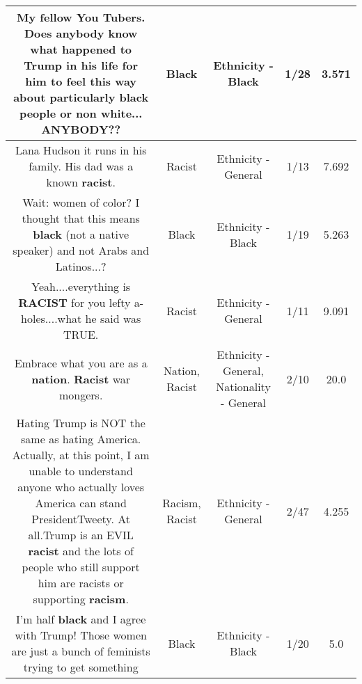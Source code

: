 \documentclass[11pt]{article}
\newlength\mylength
\begin{document}
\begin{center}
\begin{longtable}{|C{.65\mylength}|C{.30\mylength}|C{.12\mylength}|C{.12\mylength}|C{.12\mylength}|}
  \small My fellow You Tubers. Does anybody know what happened to Trump in his life for him to feel this way about particularly \textbf{black} people or non white... ANYBODY??\normalsize   & Black & Ethnicity - Black & 1/28 & 3.571 \\  \hline
  \small Lana Hudson  it runs in his family. His dad was a known \textbf{racist}.\normalsize   & Racist & Ethnicity - General & 1/13 & 7.692 \\  \hline
  \small Wait: women of color? I thought that this means \textbf{black} (not a native speaker) and not Arabs and Latinos...?\normalsize   & Black & Ethnicity - Black & 1/19 & 5.263 \\  \hline
  \small Yeah....everything is \textbf{RACIST} for you lefty a-holes....what he said was TRUE.\normalsize   & Racist & Ethnicity - General & 1/11 & 9.091 \\  \hline
  \small Embrace what you are as a \textbf{nation}. \textbf{Racist} war mongers.\normalsize   & Nation, Racist & Ethnicity - General, Nationality - General & 2/10 & 20.0 \\  \hline
  \small Hating Trump is NOT the same as hating America. Actually, at this point, I am unable to understand anyone who actually loves America can stand PresidentTweety. At all.Trump is an EVIL \textbf{racist} and the lots of people who still support him are racists or supporting \textbf{racism}.\normalsize   & Racism, Racist & Ethnicity - General & 2/47 & 4.255 \\  \hline
  \small I'm half \textbf{black} and I agree with Trump! Those women are just a bunch of feminists trying to get something\normalsize   & Black & Ethnicity - Black & 1/20 & 5.0 \\  \hline

\end{longtable}
\end{center}
\end{document}
